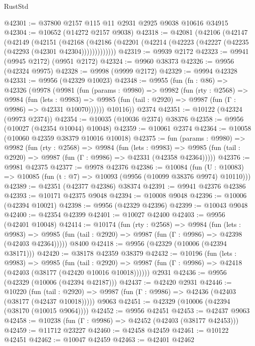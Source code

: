 \begin{lexlean}{RustStd}
\begin{coremodule}
@42301 := @37800 @2157 @115 @11 @2931 @2925 @9038 @10616 @34915
@42304 := @10652 (@14272 @2157 @9038)
@42318 := @42081
    (@42106
      (@42147
        (@42149
          (@42151
            (@42168
              (@42186 (@42201 (@42214 (@42223 (@42227 (@42235 (@42293 (@42301 @42304)))))))))))))
@42319 := @9939 @2172
@42323 := @9941 (@9945 @2172) (@9951 @2172)
@42324 := @9960 @38373
@42326 := @9956 (@42324 @9975)
@42328 := @9998 (@9999 @2172)
@42329 := @9994 @42328
@42331 := @9956 (@42329 @10023)
@42348 := @9955
    (fun (fn : @86) =>
    @42326
      (@9978
        (@9981
          (fun (params : @9980) =>
          @9982
            (fun (rty : @2568) =>
            @9984
              (fun (lets : @9983) =>
              @9985 (fun (tail : @2920) => @9987 (fun (Γ : @9986) => @42331 @10070))))))
        @10116))
    @2374
@42351 := @10122 (@42324 (@9973 @2374))
@42354 := @10035 (@10036 @2374) @38376
@42358 := @9956 (@10027 (@42354 @10044) @10048)
@42359 := @10061 @2374
@42364 := @10058 (@10060 @42359 @38379 @10016 @10018)
@42375 := fun (params : @9980) =>
  @9982
    (fun (rty : @2568) =>
    @9984
      (fun (lets : @9983) =>
      @9985 (fun (tail : @2920) => @9987 (fun (Γ : @9986) => @42331 (@42358 @42364)))))
@42376 := @9981 @42375
@42377 := @9978 @42376
@42386 := @10084
    (fun (U : @10083) => @10085 (fun (t : @7) => @10093 (@9956 (@10099 @38376 @9974) @10110)))
@42389 := @42351 (@42377 @42386) @38374
@42391 := @9941 @42376 @42386
@42393 := @10171 @42375 @9048
@42394 := @10008 @9048
@42396 := @10006 (@42394 @10021)
@42398 := @9956 (@42329 @42396)
@42399 := @10043 @9048
@42400 := @42354 @42399
@42401 := @10027 @42400
@42403 := @9956 (@42401 @10048)
@42414 := @10174
    (fun (rty : @2568) =>
    @9984
      (fun (lets : @9983) =>
      @9985 (fun (tail : @2920) => @9987 (fun (Γ : @9986) => @42398 (@42403 @42364)))))
    @8400
@42418 := @9956 (@42329 (@10006 (@42394 @38171)))
@42420 := @38178 @42359 @38379
@42432 := @10196
    (fun (lets : @9983) =>
    @9985
      (fun (tail : @2920) =>
      @9987 (fun (Γ : @9986) => @42418 (@42403 (@38177 (@42420 @10016 @10018))))))
    @2931
@42436 := @9956 (@42329 (@10006 (@42394 @42187)))
@42437 := @42420 @2931
@42446 := @10220
    (fun (tail : @2920) => @9987 (fun (Γ : @9986) => @42436 (@42403 (@38177 (@42437 @10018)))))
    @9063
@42451 := @42329 (@10006 (@42394 (@38170 (@10015 @9064))))
@42452 := @9956 @42451
@42453 := @42437 @9063
@42458 := @10238 (fun (Γ : @9986) => @42452 (@42403 (@38177 @42453)))
@42459 := @11712 @23227
@42460 := @42458 @42459
@42461 := @10122 @42451
@42462 := @10047 @42459
@42463 := @42401 @42462

\end{coremodule}
\end{lexlean}

